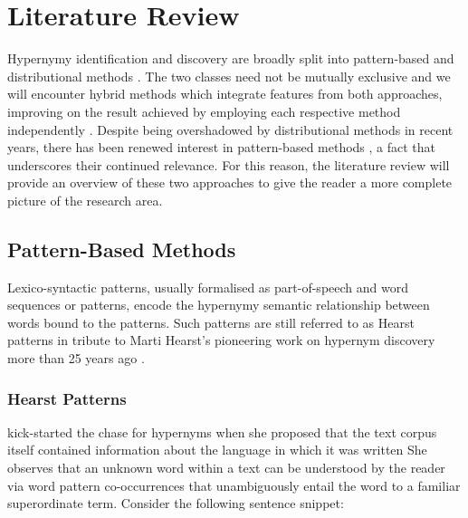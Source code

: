 \chapter{Literature Review}
Hypernymy identification and discovery are broadly split into pattern-based and distributional methods \citep{camacho2018semeval, Wang2017}.  The two classes need not be mutually exclusive and we will encounter hybrid methods which integrate features from both approaches, improving on the result achieved by employing each respective method independently  \citep{shwartz2016path, bernier2018crim}.  Despite being overshadowed by distributional methods in recent years, there has been renewed interest in pattern-based methods \citep{roller2018hearst}, a fact that underscores their continued relevance.
For this  reason, the literature review will provide an overview of these two approaches to give the reader a more complete picture of the research area. 

\section{Pattern-Based Methods} \label{Pattern-Based Methods}
Lexico-syntactic patterns, usually formalised as part-of-speech and word sequences or patterns, %
encode the hypernymy semantic relationship between words bound to the patterns.  Such patterns are still referred to as Hearst patterns in tribute to Marti Hearst's pioneering work on hypernym discovery more than 25 years ago \citep{hearst1992automatic}.

\subsection{Hearst Patterns} \label{Hearst Patterns}
\citeauthor{hearst1992automatic} kick-started the chase for hypernyms when she proposed that the text corpus itself contained information about the language in which it was written %
She observes that an unknown word within a text can be understood by the reader via word pattern co-occurrences that unambiguously entail the word to a familiar superordinate term.%
Consider the following sentence snippet:

